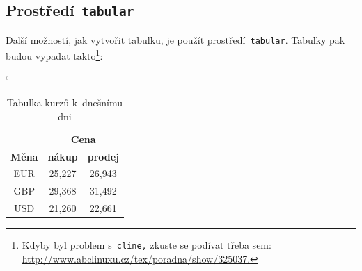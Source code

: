 \documentclass[11pt]{article}
\begin{document}
\subsection{Prostředí\texttt{ tabular}}
Další možností, jak vytvořit tabulku, je použít prostředí\texttt{ tabular}. Tabulky pak budou vypadat takto\footnote{Kdyby byl problem s\texttt{ cline,} zkuste se podívat třeba sem:
\href{http://www.abclinuxu.cz/tex/poradna/show/325037}{http://www.abclinuxu.cz/tex/poradna/show/325037.}}:
\bigskip
\begin{table}[h]
    \centering  
    \catcode`
    \begin{tabular}{|c|c|c|} \hline      
                      & \multicolumn{2}{c|}{\textbf{Cena}}\\ \cline{2-3}
        \textbf{Měna} & \textbf{nákup} & \textbf{prodej} \\
        \hline
            EUR & 25,227 & 26,943 \\
            GBP & 29,368 & 31,492 \\
            USD & 21,260 & 22,661 \\
        \hline
    \end{tabular}
    \caption{Tabulka kurzů k~dnešnímu dni}
    \label{tab:kurzy}
\end{table}
\bigskip
\end{document}
